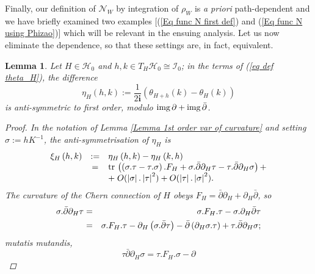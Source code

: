 \documentclass{article}
\newcommand{\func}[1]{\textnormal {#1\,}}
\newtheorem{lemma}[theorem]{Lemma}
\begin{document}
Finally, our definition of $\mathcal{N}_{W}$ by integration of $\rho _{W}$ is \emph{a
priori }path-dependent and we have briefly examined two examples [(\ref{Eq func N first def}) and 
(\ref{Eq func N using Phizao})] which will be relevant in the ensuing analysis. Let us now eliminate the dependence, so that these settings
are, in fact,  equivalent.
\begin{lemma}   \label{Lemma antisymmetric theta}
Let $H\in\mathcal{H}_0$ and $h,k\in T_H\mathcal{H}_0 \cong\mathcal{I}_0 $; in the terms of (\ref{eq def theta_H}), the difference 
\begin{equation*}
\eta _{H}\left( h,k\right) := \frac{1}{2\mathbf{i}}\left( \theta
_{H+h}\left( k\right) -\theta _{H}\left( k\right) \right)
\end{equation*}
 is anti-symmetric to first order, modulo $\func{img}\partial +\func{img}\bar{\partial}$.
\begin{proof}
In the notation of \emph{Lemma \ref{Lemma 1st order var of curvature}} and setting $\sigma:= hK^{-1}$, the
anti-symmetrisation of $\eta _{H}$ is 
\begin{equation}     \label{antisymmetrisation form}
\begin{array}{r c l}
        \xi _{H}\left( h,k\right) &:= &\eta _{H}\left( h,k\right) 
        -\eta_{H}\left( k,h\right)   \\
        &=&\func{tr}\left( \left( \sigma .\tau -\tau .\sigma \right)
        .F_{H}+\sigma .\bar{\partial}\partial _{H}\tau 
        -\tau .\bar{\partial}\partial _{H}\sigma \right)+ \\
        &&+ \; O( \left\vert\sigma\right\vert.\left\vert\tau\right\vert ^{2})
        +O( \left\vert\tau\right\vert.\left\vert\sigma\right\vert ^{2}).\\
\end{array}
\end{equation}
The curvature of the Chern connection of $H$ obeys $F_{H}=\bar{\partial}%
\partial _{H}+\partial _{H}\bar{\partial}$, so%
\begin{eqnarray*}
\sigma .\bar{\partial}\partial _{H}\tau &=&\sigma .F_{H}.\tau -\sigma
.\partial _{H}\bar{\partial}\tau \\
&=&\sigma .F_{H}.\tau -\partial _{H}\left( \sigma .\bar{\partial}\tau
\right) -\bar{\partial}\left( \partial _{H}\sigma .\tau \right) +\tau .\bar{%
\partial}\partial _{H}\sigma ;
\end{eqnarray*}%
\emph{mutatis mutandis}, 
\begin{equation*}
\tau \bar{\partial}\partial _{H}\sigma =\tau .F_{H}.\sigma -\partial

\end{equation*}
\end{proof}
\end{lemma}
\end{document}
